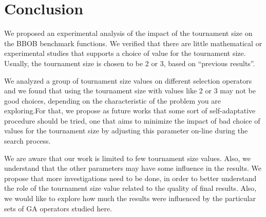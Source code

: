 \section{Conclusion}
\label{sec:conclusion}


We proposed an experimental analysis of the impact of the tournament size on the BBOB benchmark functions. We verified that there are little mathematical or experimental studies that supports a choice of value for the tournament size. Usually, the tournament size is chosen to be 2 or 3, based on ``previous results''.
 
We analyzed a group of tournament size values on different selection operators and we found that using the tournament size with values like 2 or 3 may not be good choices, depending on the characteristic of the problem you are exploring.For that, we propose as future works that some sort of self-adaptative procedure should be tried, one that aims to minimize the impact of bad choice of values for the tournament size by adjusting this parameter on-line during the search process.

We are aware that our work is limited to few tournament size values. Also, we understand that the other parameters may have some influence in the results. We propose that more investigations need to be done, in order to better understand the role of the tournament size value related to the quality of final results. Also, we would like to explore how much the results were influenced by the particular sets of GA operators studied here.


